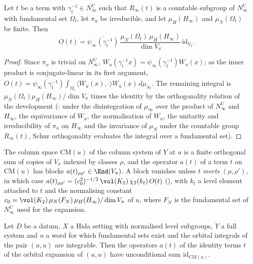 \begin{lemma}\label{pf:open0:oot}
Let $t$ be a term with $\gamma_t^{-1}\in N^U_\infty$ such that $R_\infty(t)$ is a countable subgroup of $N^U_\infty$ with fundamental set
$\Omega_t$, let $\pi_u$ be irreducible, and let $\mu_H(H_\infty)$ and $\mu_N(\Omega_t)$ be finite. Then
\[
O(t)=\overline{\psi_\infty(\gamma_t^{-1})}\,\frac{\mu_N(\Omega_t)\,\mu_H(H_\infty)}{\dim V_\pi}\,\mathrm{id}_{V_\pi}.
\]
\end{lemma}

\begin{proof}
Since $\pi_u$ is trivial on $N^U_\infty$, $W_u(\gamma_t^{-1}x)=\psi_\infty(\gamma_t^{-1})W_u(x)$; as the inner product is
conjugate-linear in its first argument, $O(t)=\overline{\psi_\infty(\gamma_t^{-1})}\int_{\Omega_t}\langle W_u(x),\cdot\rangle W_u(x)\,d\mu_\infty$.
The remaining integral is $\mu_N(\Omega_t)\mu_H(H_\infty)/\dim V_\pi$ times the identity by the orthogonality relation of the development
(: under the disintegration of $\mu_\infty$ over the product of $N^U_\infty$ and $H_\infty$, the
equivariance of $W_u$, the normalisation of $W_u$, the unitarity and irreducibility of $\pi_u$ on $H_\infty$ and the invariance of $\mu_N$
under the countable group $R_\infty(t)$, Schur orthogonality evaluates the integral over a fundamental set).
\end{proof}

The column space $\mathrm{CM}(u)$ of the column system of $Y$ at $u$ is a finite orthogonal sum of copies of $V_\pi$ indexed by
classes $\rho$, and the operator $a(t)$ of a term $t$ on $\mathrm{CM}(u)$ has blocks $a(t)_{\rho\rho'}\in\End(V_\pi)$. A block vanishes
unless $t$ \emph{meets} $(\rho,\rho')$, in which case
$a(t)_{\rho\rho'}=(c_0^2)^{-1/2}\,\vol(K_2)\,\chi_2(k_t)\,O(t)$ (), with $k_t$ a level element
attached to $t$ and the normalising constant $c_0=\vol(K_2)\,\mu_N(F_N)\,\mu_H(H_\infty)/\dim V_\pi$ of $u$, where $F_N$ is the fundamental
set of $N^U_\infty$ used for the expansion.

\begin{lemma}\label{pf:open0:idcells}
Let $D$ be a datum, $X$ a Hida setting with normalised level subgroups, $Y$ a full system and $u$ a word for which fundamental sets
exist and the orbital integrals of the pair $(u,u)$ are integrable. Then the operators $a(t)$ of the identity terms $t$ of the orbital
expansion of $(u,u)$ have unconditional sum $\mathrm{id}_{\mathrm{CM}(u)}$.
\ \
\ \
\ \
\ 
\end{lemma}

